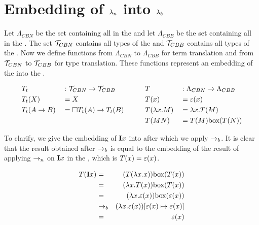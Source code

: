 \section{\texorpdfstring{Embedding of \boldmath${\lambda_n}$ into \boldmath${\lambda_b}$}{Embedding of call-by-name lambda calculus into the call-by-box lambda calculus}}


Let $\Lambda_{CBN}$ be the set containing all \lterms in the \lan
and let $\Lambda_{CBB}$ be the set containing all \lterms in the \lab. 
The set $\mathcal{T}_{CBN}$ contains all types of the \lan and $\mathcal{T}_{CBB}$ contains all types of the \lab. 
Now we define functions from $\Lambda_{CBN}$ to $\Lambda_{CBB}$ for term translation and from $\mathcal{T}_{CBN}$ to $\mathcal{T}_{CBB}$ for type translation. 
These functions represent an embedding of the \lan into the \lab. 

\[
\begin{aligned}
  & T_t          & & : \mathcal{T}_{CBN} \to \mathcal{T}_{CBB}           & & \quad & & T              & &: \Lambda_{CBN} \to \Lambda_{CBB} \\
  & T_t(X)       & & = X                               & & \quad & & T(x)           & &= \varepsilon(x) \\
  & T_t(A \to B) & & = \square{T_t(A)} \to T_t(B)  & & \quad & & T(\lambda {x}.{M}) & &= \lambda {x}.{T(M)} \\
  &                 & &                                   & & \quad & & T(M N)         & &= T(M) \text{box}({T(N)})
\end{aligned}
\]

To clarify, we give the embedding of $\mathbf{I} x$ into \lab after which we apply $\to_b$. 
It is clear that the result obtained after $\to_b$ is equal to the embedding of the result of applying $\to_n$ on $\mathbf{I} x$ in the \lan, which is $T(x) = \varepsilon(x)$.  

\begin{eqnarray*}
  T(\mathbf{I} x) &=& (T(\lambda {x}.{x})) \text{box}({T(x)}) \\
  &=& (\lambda {x}.{T(x)}) \text{box}({T(x)}) \\
  &=& (\lambda {x}.{\varepsilon(x)}) \text{box}({\varepsilon(x)}) \\
  &\to_b& (\lambda {x}.{\varepsilon(x)}) [{\varepsilon(x)}\mapsto{\varepsilon(x)}] \\
  &=& \varepsilon(x)
\end{eqnarray*}

